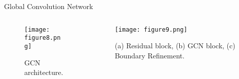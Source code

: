 \documentclass[10pt,aspectratio=169,dvipsnames]{beamer} %
\begin{document}
	\begin{frame}{Global Convolution Network}
		\begin{columns}[T]
			\begin{column}[c]{0.55\textwidth}
				\begin{figure}
					\centering
					\texttt{[image: figure8.png]}
					\caption{GCN architecture.} 
				\end{figure}	
			\end{column}
			\begin{column}[c]{0.45\textwidth}
				\begin{figure}
					\centering
					\texttt{[image: figure9.png]}
					\caption{(a) Residual block, (b) GCN block, (c) Boundary Refinement.} 
				\end{figure}	
			\end{column}
		\end{columns}
	\end{frame}	
	
			
	\setcounter{subfigure}{0}
\end{document}
